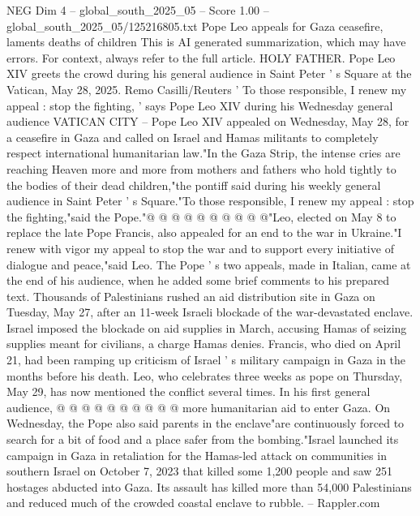 \begin{textsample}{NEG Dim 4 – global\_south\_2025\_05 – Score 1.00 – global\_south\_2025\_05/125216805.txt}  \label{ex:f4_neg_368}
Pope Leo appeals for Gaza ceasefire, laments deaths of children This is AI generated summarization, which may have errors.
For context, always refer to the full article.
HOLY FATHER.
Pope Leo XIV greets the crowd during his general audience in Saint Peter ' s Square at the Vatican, May 28, 2025.
Remo Casilli/Reuters ' To those responsible, I renew my appeal : stop the fighting, ' says Pope Leo XIV during his Wednesday general audience VATICAN CITY -- Pope Leo XIV appealed on Wednesday, May 28, for a ceasefire in Gaza and called on Israel and Hamas militants to completely respect international humanitarian law."In the Gaza Strip, the intense cries are reaching Heaven more and more from mothers and fathers who hold tightly to the bodies of their dead children,"the pontiff said during his weekly general audience in Saint Peter ' s Square."To those responsible, I renew my appeal : stop the fighting,"said the Pope."@ @ @ @ @ @ @ @ @ @"Leo, elected on May 8 to replace the late Pope Francis, also appealed for an end to the war in Ukraine."I renew with vigor my appeal to stop the war and to support every initiative of dialogue and peace,"said Leo.
The Pope ' s two appeals, made in Italian, came at the end of his audience, when he added some brief comments to his prepared text.
Thousands of Palestinians rushed an aid distribution site in Gaza on Tuesday, May 27, after an 11-week Israeli blockade of the war-devastated enclave.
Israel imposed the blockade on aid supplies in March, accusing Hamas of seizing supplies meant for civilians, a charge Hamas denies.
Francis, who died on April 21, had been ramping up criticism of Israel ' s military campaign in Gaza in the months before his death.
Leo, who celebrates three weeks as pope on Thursday, May 29, has now mentioned the conflict several times.
In his first general audience, @ @ @ @ @ @ @ @ @ @ more humanitarian aid to enter Gaza.
On Wednesday, the Pope also said parents in the enclave"are continuously forced to search for a bit of food and a place safer from the bombing."Israel launched its campaign in Gaza in retaliation for the Hamas-led attack on communities in southern Israel on October 7, 2023 that killed some 1,200 people and saw 251 hostages abducted into Gaza.
Its assault has killed more than 54,000 Palestinians and reduced much of the crowded coastal enclave to rubble. -- Rappler.com

\end{textsample}
